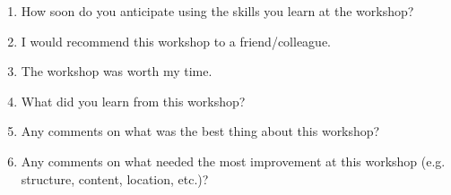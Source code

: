\documentclass{article}
\begin{document}
\begin{enumerate}
    \item How soon do you anticipate using the skills you learn at the workshop?
    
    \item I would recommend this workshop to a friend/colleague.
    
    \item The workshop was worth my time.
    
    \item What did you learn from this workshop?

    \item Any comments on what was the best thing about this workshop?

    \item Any comments on what needed the most improvement at this workshop (e.g. structure,
content, location, etc.)?

\end{enumerate}
\end{document}

